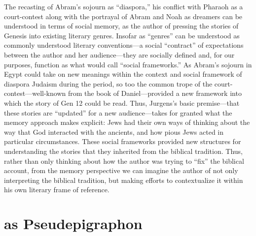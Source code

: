 


The recasting of Abram's sojourn as ``diaspora,'' his conflict with Pharaoh as a court-contest along with the portrayal of Abram and Noah as dreamers can be understood in terms of social memory, as the author of \ga pressing the stories of Genesis into existing literary genres. Insofar as ``genres'' can be understood as commonly understood literary conventions---a social ``contract'' of expectations between the author and her audience---they are socially defined and, for our purposes, function as what \halbwachs would call ``social frameworks.'' As Abram's sojourn in Egypt could take on new meanings within the context and social framework of diaspora Judaism during the \secondtemple period, so too the common trope of the court-contest---well-known from the book of Daniel---provided a new framework into which the story of Gen 12 could be read. Thus, Jurgens's basic premise---that these stories are ``updated'' for a new audience---takes for granted what the memory approach makes explicit: \secondtemple Jews had their own ways of thinking about the way that God interacted with the ancients, and how pious Jews acted in particular circumstances. These social frameworks provided new structures for understanding the stories that they inherited from the biblical tradition. Thus, rather than only thinking about how the author was trying to ``fix'' the biblical account, from the memory perspective we can imagine the author of \ga not only interpreting the biblical tradition, but making efforts to contextualize it within his own literary frame of reference.

\section{\ga as Pseudepigraphon}

